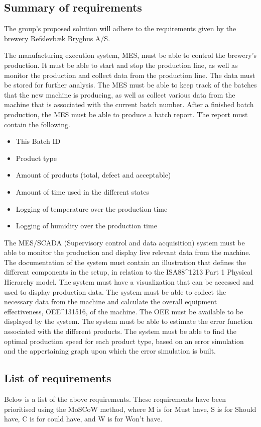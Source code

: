 \subsection{Summary of requirements}
The group's proposed solution will adhere to the requirements given by the brewery Refslevbæk Bryghus A/S.

The manufacturing execution system, MES, must be able to control the brewery’s production.
It must be able to start and stop the production line,
as well as monitor the production and collect data from the production line.
The data must be stored for further analysis.
The MES must be able to keep track of the batches that the new machine is producing,
as well as collect various data from the machine that is associated with the current batch number.
After a finished batch production, the MES must be able to produce a batch report.
The report must contain the following.

\begin{itemize}
    \item This Batch ID
    \item Product type
    \item Amount of products (total, defect and acceptable)
    \item Amount of time used in the different states
    \item Logging of temperature over the production time
    \item Logging of humidity over the production time
\end{itemize}

The MES/SCADA (Supervisory control and data acquisition) system must be able to monitor the production and display live relevant data from the machine.
The documentation of the system must contain an illustration that defines the different components in the setup, in relation to the ISA88\^{}1213 Part 1 Physical Hierarchy model.
The system must have a visualization that can be accessed and used to display production data.
The system must be able to collect the necessary data from the machine and calculate the overall equipment effectiveness, OEE\^{}131516, of the machine. The OEE must be available to be displayed by the system.
The system must be able to estimate the error function associated with the different products.
The system must be able to find the optimal production speed for each product type, based on an error simulation and the appertaining graph upon which the error simulation is built.

\subsection{List of requirements}
Below is a list of the above requirements. These requirements have been
prioritised using the MoSCoW method, where M is for Must have, S is for
Should have, C is for could have, and W is for Won't have. 

